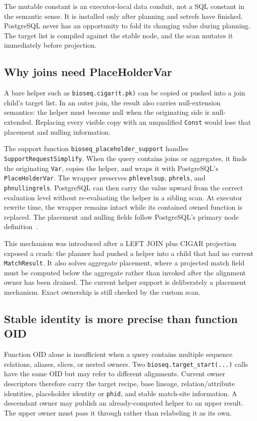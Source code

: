 The mutable constant is an executor-local data conduit, not a SQL constant in
the semantic sense.  It is installed only after planning and setrefs have
finished.  PostgreSQL never has an opportunity to fold its changing value
during planning.  The target list is compiled against the stable node, and
the scan mutates it immediately before projection.

\subsection{Why joins need PlaceHolderVar}

A bare helper such as \texttt{bioseq.cigar(t.pk)} can be copied or pushed into
a join child's target list.  In an outer join, the result also carries
null-extension semantics: the helper must become null when the originating
side is null-extended.  Replacing every visible copy with an unqualified
\texttt{Const} would lose that placement and nulling information.

The support function \texttt{bioseq\_placeholder\_support} handles
\texttt{SupportRequestSimplify}.  When the query contains joins or
aggregates, it finds the originating \texttt{Var}, copies the helper, and
wraps it with PostgreSQL's \texttt{PlaceHolderVar}.  The wrapper preserves
\texttt{phlevelsup}, \texttt{phrels}, and \texttt{phnullingrels}.  PostgreSQL
can then carry the value upward from the correct evaluation level without
re-evaluating the helper in a sibling scan.  At executor rewrite time, the
wrapper remains intact while its contained owned function is replaced.  The
placement and nulling fields follow PostgreSQL's primary node
definition~\cite{postgresql17_placeholdervar}.

This mechanism was introduced after a LEFT JOIN plus CIGAR projection exposed
a crash: the planner had pushed a helper into a child that had no current
\texttt{MatchResult}.  It also solves aggregate placement, where a projected
match field must be computed below the aggregate rather than invoked after
the alignment owner has been drained.  The current helper support is
deliberately a placement mechanism.  Exact ownership is still checked by the
custom scan.

\subsection{Stable identity is more precise than function OID}

Function OID alone is insufficient when a query contains multiple sequence
relations, aliases, slices, or nested owners.  Two
\texttt{bioseq.target\_start(...)} calls have the same OID but may refer to
different alignments.  Current owner descriptors therefore carry the target
recipe, base lineage, relation/attribute identities, placeholder identity or
\texttt{phid}, and stable match-site information.  A descendant owner may
publish an already-computed helper to an upper result.  The upper owner must
pass it through rather than relabeling it as its own.

